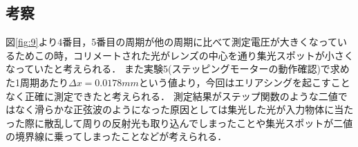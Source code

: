 \documentclass[11pt, a4paper,twocolumn]{jarticle}
\begin{document}
\subsection{考察}
図\ref{fig:9}より4番目，5番目の周期が他の周期に比べて測定電圧が大きくなっているためこの時，コリメートされた光がレンズの中心を通り集光スポットが小さくなっていたと考えられる．
また実験5(ステッピングモーターの動作確認)で求めた1周期あたり$\Delta{x} = 0.0178mm$という値より，今回はエリアシングを起こすことなく正確に測定できたと考えられる．
測定結果がステップ関数のような二値ではなく滑らかな正弦波のようになった原因としては集光した光が入力物体に当たった際に散乱して周りの反射光も取り込んでしまったことや集光スポットが二値の境界線に乗ってしまったことなどが考えられる．
\newpage
\end{document}
